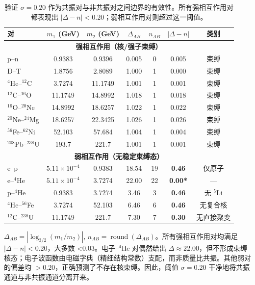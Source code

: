 \documentclass[11pt,a4paper]{article}
\theoremstyle{remark}
\begin{document}
	\begin{table}[H]
		\centering
		\caption{验证 \(\sigma = 0.20\) 作为共振对与非共振对之间边界的有效性。所有强相互作用对都表现出 \(|\Delta-n| < 0.20\)；弱相互作用对则超过这一阈值。}
		\label{tab:sigma_validation_heavy}
		\small
		\begin{tabular}{l c c c c c c}
			\toprule
			对 & \(m_1\) (GeV) & \(m_2\) (GeV) & \(\Delta_{AB}\) & \(n_{AB}\) & \(|\Delta-n|\) & 类别 \\
			\midrule
			\multicolumn{7}{c}{\textbf{强相互作用（核/强子束缚）}} \\
			p--n           & 0.9383 & 0.9396 & 0.005  & 0 & 0.005 & 束缚 \\
			D--T           & 1.8756 & 2.8089 & 1.000  & 1 & 0.000 & 束缚 \\
			$^4$He--$^{12}$C  & 3.7274 & 11.1749& 1.001  & 1 & 0.001 & 束缚 \\
			$^{12}$C--$^{16}$O & 11.1749& 14.8992& 1.018  & 1 & 0.018 & 束缚 \\
			$^{16}$O--$^{20}$Ne& 14.8992& 18.6257& 1.022  & 1 & 0.022 & 束缚 \\
			$^{20}$Ne--$^{24}$Mg& 18.6257& 22.3425& 1.026  & 1 & 0.026 & 束缚 \\
			$^{56}$Fe--$^{62}$Ni& 52.103 & 57.684 & 1.004  & 1 & 0.004 & 束缚 \\
			$^{208}$Pb--$^{238}$U& 193.7  & 221.7  & 1.001  & 1 & 0.001 & 束缚 \\
			\midrule
			\multicolumn{7}{c}{\textbf{弱相互作用（无稳定束缚态）}} \\
			e--p           & $5.11\times10^{-4}$ & 0.9383 & 18.54  & 19 & \textbf{0.46} & 仅原子 \\
			e--$^4$He      & $5.11\times10^{-4}$ & 3.7274 & 22.00  & 22 & \textbf{0.00*} & — \\
			p--$^4$He      & 0.9383 & 3.7274 & 3.46   & 3  & \textbf{0.46} & 无 $^5$Li \\
			$^4$He--$^{56}$Fe & 3.7274 & 52.103 & 6.46   & 6  & \textbf{0.46} & 无复合核 \\
			$^{12}$C--$^{238}$U& 11.1749& 221.7  & 7.30   & 7  & \textbf{0.30} & 无直接聚变 \\
			\bottomrule
		\end{tabular}
		\par\smallskip
		\footnotesize
		\(\Delta_{AB} = |\log_{3/2}(m_1/m_2)|\), \(n_{AB} = \operatorname{round}(\Delta_{AB})\)。所有强相互作用对均满足 \(|\Delta-n| < 0.20\)，大多数 <0.03。电子--$^4$He 对偶然给出 \(\Delta\approx22.00\)，但不形成束缚核态；电子波函数由电磁字典（精细结构常数）支配，而非质量比共振。其他弱对的偏差均 \(>0.20\)，正确预测了不存在核束缚。因此，阈值 \(\sigma = 0.20\) 干净地将共振通道与非共振通道分离开来。
	\end{table}
	
\end{document}
